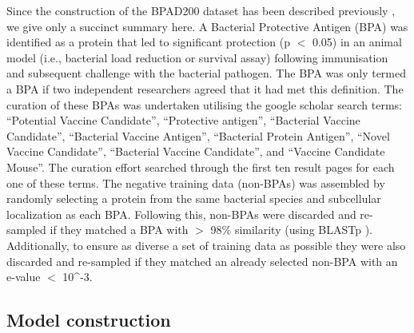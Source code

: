 \documentclass[10pt,journal,compsoc,twoside]{IEEEtran}
\begin{document}
Since the construction of the BPAD200 dataset has been described previously \cite{heinson_2017}, we give only a succinct summary here. A Bacterial Protective Antigen (BPA) was identified as a protein that led to significant protection (p $<$ 0.05) in an animal model (i.e., bacterial load reduction or survival assay) following immunisation and subsequent challenge with the bacterial pathogen. The BPA was only termed a BPA if two independent researchers agreed that it had met this definition. The curation of these BPAs was undertaken utilising the google scholar search terms: “Potential Vaccine Candidate”, “Protective antigen”, “Bacterial Vaccine Candidate”, “Bacterial Vaccine Antigen”, “Bacterial Protein Antigen”, “Novel Vaccine Candidate”, “Bacterial Vaccine Candidate”, and “Vaccine Candidate Mouse”. The curation effort searched through the first ten result pages for each one of these terms. The negative training data (non-BPAs) was assembled by randomly selecting a protein from the same bacterial species and subcellular localization as each BPA. Following this, non-BPAs were discarded and re-sampled if they matched a BPA with $>$ 98\% similarity (using BLASTp \cite{blast}). Additionally, to ensure as diverse a set of training data as possible they were also discarded and re-sampled if they matched an already selected non-BPA with an e-value $<$ 10^{-3}\cite{heinson_2017}\cite{blast}.


\subsection{Model construction}
\label{sec:methods2}
\end{document}

